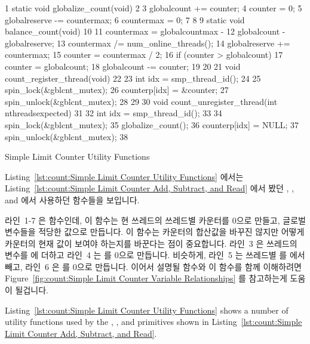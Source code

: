 \begin{listing}[tbp]
{ \scriptsize
\begin{verbbox}
  1 static void globalize_count(void)
  2 {
  3   globalcount += counter;
  4   counter = 0;
  5   globalreserve -= countermax;
  6   countermax = 0;
  7 }
  8 
  9 static void balance_count(void)
 10 {
 11   countermax = globalcountmax -
 12                globalcount - globalreserve;
 13   countermax /= num_online_threads();
 14   globalreserve += countermax;
 15   counter = countermax / 2;
 16   if (counter > globalcount)
 17     counter = globalcount;
 18   globalcount -= counter;
 19 }
 20 
 21 void count_register_thread(void)
 22 {
 23   int idx = smp_thread_id();
 24 
 25   spin_lock(&gblcnt_mutex);
 26   counterp[idx] = &counter;
 27   spin_unlock(&gblcnt_mutex);
 28 }
 29 
 30 void count_unregister_thread(int nthreadsexpected)
 31 {
 32   int idx = smp_thread_id();
 33 
 34   spin_lock(&gblcnt_mutex);
 35   globalize_count();
 36   counterp[idx] = NULL;
 37   spin_unlock(&gblcnt_mutex);
 38 }
\end{verbbox}
}
\centering
\theverbbox
\caption{Simple Limit Counter Utility Functions}
\label{lst:count:Simple Limit Counter Utility Functions}
\end{listing}

Listing~\ref{lst:count:Simple Limit Counter Utility Functions} 에서는
Listing~\ref{lst:count:Simple Limit Counter Add, Subtract, and Read} 에서 봤던 
, , and  에서 사용하던
함수들을 보입니다.

라인~1-7 은  함수인데, 이 함수는 현 쓰레드의 쓰레드별
카운터를 0으로 만들고, 글로벌 변수들을 적당한 값으로 만듭니다.
이 함수는 카운터의 합산값을 바꾸진 않지만 어떻게 카운터의 현재 값이 보여야
하는지를 바꾼다는 점이 중요합니다.
라인~3 은 쓰레드의  변수를  에 더하고 라인~4 는
 를 0으로 만듭니다.
비슷하게, 라인~5 는 쓰레드별  를  에서 빼고,
라인~6 은  를 0으로 만듭니다.
이어서 설명될  함수와 이 함수를 함께 이해하려면
Figure~\ref{fig:count:Simple Limit Counter Variable Relationships}
를 참고하는게 도움이 될겁니다.
\iffalse

Listing~\ref{lst:count:Simple Limit Counter Utility Functions}
shows a number of utility functions used by the ,
, and  primitives shown in
Listing~\ref{lst:count:Simple Limit Counter Add, Subtract, and Read}.

